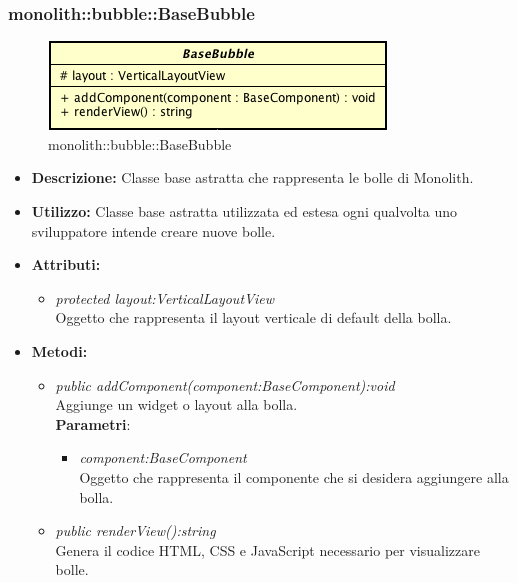 \subsubsection{monolith::bubble::BaseBubble}

\label{monolith::bubble::BaseBubble}
\begin{figure}[ht]
	\centering
	\includegraphics[scale=0.5]{Sezioni/SottosezioniST/img/BaseBubble.png}
	\caption{monolith::bubble::BaseBubble}
\end{figure}

\begin{itemize}
\item \textbf{Descrizione:} Classe base astratta che rappresenta le bolle di Monolith.
\item \textbf{Utilizzo:} Classe base astratta utilizzata ed estesa ogni qualvolta uno sviluppatore intende creare nuove bolle.
\item \textbf{Attributi:} 
\begin{itemize}
\item \textit{protected layout:VerticalLayoutView}\\
Oggetto che rappresenta il layout verticale di default della bolla.
\end{itemize}
\item \textbf{Metodi:}
\begin{itemize}
	\item \textit{public addComponent(component:BaseComponent):void}\\
Aggiunge un widget o layout alla bolla.
		  \\ \textbf{Parametri}: \begin{itemize}
				\item \textit{component:BaseComponent}\\
					Oggetto che rappresenta il componente che si desidera aggiungere alla bolla.
			\end{itemize}
	\item \textit{public renderView():string}\\
Genera il codice HTML, CSS e JavaScript necessario per visualizzare bolle.
\end{itemize}
\end{itemize}

